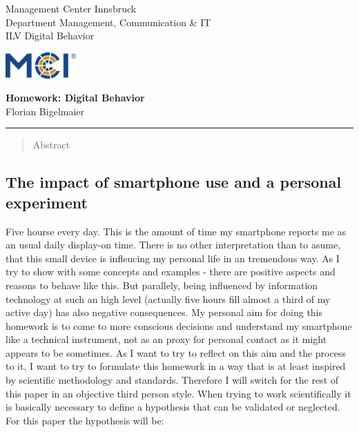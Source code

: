 \documentclass[11pt,letterpaper]{article}
\newcommand{\fontsmall}{\fontsize{7pt}{10pt}\selectfont}
\begin{document}
    



\noindent\begin{minipage}{0.5\textwidth}
\fontsmall
Management Center Innsbruck \\
Department Management, Communication \& IT  \\
ILV Digital Behavior


\end{minipage}%
\hfill%
\begin{minipage}{0.3\textwidth}\raggedleft
\includegraphics[height=1.0cm]{mci-logo.png}

\end{minipage}


 
\begin{center}
\textbf{\large Homework: Digital Behavior}\\   %
Florian Bigelmaier\\                         %
\end{center}
\rule{\linewidth}{0.1mm}




\begin{abstract}
    \noindent
Abstract
\end{abstract}

\subsection*{The impact of smartphone use and a personal experiment}
Five hourse every day. This is the amount of time my smartphone reports me as an usual daily display-on time. There is no other interpretation than to asume, that this small device is infleucing my personal life in an tremendous way. As I try to show with some concepts and examples - there are positive aspects and reasons to behave like this. But parallely, being influenced by information technology at such an high level (actually five hours fill almost a third of my active day) has also negative consequences. My personal aim for doing this homework is to come to more conscious decisions and understand my smartphone like a technical instrument, not as an proxy for personal contact as it might appears to be sometimes. As I want to try to reflect on this aim and the process to it, I want to try to formulate this homework in a way that is at least inspired by scientific methodology and standards. Therefore I will switch for the rest of this paper in an objective third person style. When trying to work scientifically it is basically necessary to define a hypothesis that can be validated or neglected. For this paper the hypothesis will be:
\end{document}
